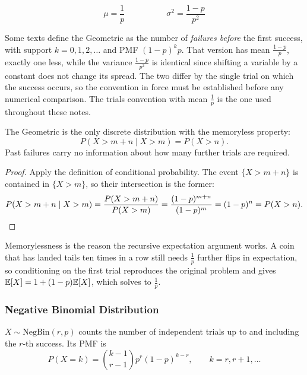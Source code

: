 \[
\mu = \frac{1}{p} \hspace{5em} \sigma^2 = \frac{1-p}{p^2}
\]

\begin{keybox}
Some texts define the Geometric as the number of \textit{failures before} the first success, with support $k = 0, 1, 2, \dots$ and PMF $(1-p)^k p$. That version has mean $\frac{1-p}{p}$, exactly one less, while the variance $\frac{1-p}{p^2}$ is identical since shifting a variable by a constant does not change its spread. The two differ by the single trial on which the success occurs, so the convention in force must be established before any numerical comparison. The trials convention with mean $\frac{1}{p}$ is the one used throughout these notes.
\end{keybox}

\begin{theorem}[Memorylessness]
The Geometric is the only discrete distribution with the memoryless property:
\[
P(X > m + n \mid X > m) = P(X > n).
\]
Past failures carry no information about how many further trials are required.
\end{theorem}

\begin{proof}
Apply the definition of conditional probability. The event $\{X > m+n\}$ is contained in $\{X > m\}$, so their intersection is the former:
\[
P(X > m+n \mid X > m) = \frac{P(X > m+n)}{P(X > m)} = \frac{(1-p)^{m+n}}{(1-p)^m} = (1-p)^n = P(X > n). \qedhere
\]
\end{proof}

Memorylessness is the reason the recursive expectation argument works. A coin that has landed tails ten times in a row still needs $\frac{1}{p}$ further flips in expectation, so conditioning on the first trial reproduces the original problem and gives $\mathbb{E}[X] = 1 + (1-p)\mathbb{E}[X]$, which solves to $\frac{1}{p}$.

\subsubsection{Negative Binomial Distribution}

\begin{definition}
$X \sim \text{NegBin}(r,p)$ counts the number of independent trials up to and including the $r$-th success. Its PMF is
\[
P(X = k) = \binom{k-1}{r-1} p^r (1-p)^{k-r}, \qquad k = r, r+1, \dots
\]
\end{definition}

